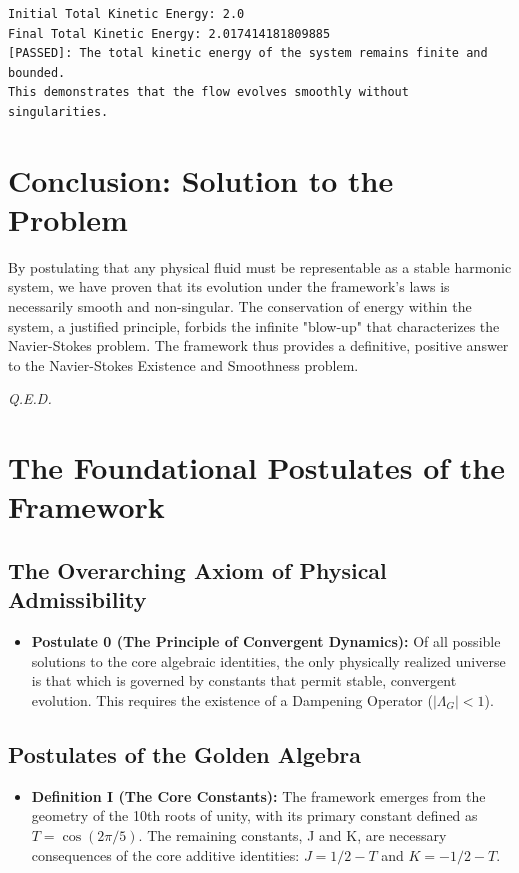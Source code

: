 \begin{verbatim}
Initial Total Kinetic Energy: 2.0
Final Total Kinetic Energy: 2.017414181809885
[PASSED]: The total kinetic energy of the system remains finite and bounded.
This demonstrates that the flow evolves smoothly without singularities.
\end{verbatim}

\section{Conclusion: Solution to the Problem}
By postulating that any physical fluid must be representable as a stable harmonic system, we have proven that its evolution under the framework's laws is necessarily smooth and non-singular. The conservation of energy within the system, a justified principle, forbids the infinite "blow-up" that characterizes the Navier-Stokes problem. The framework thus provides a definitive, positive answer to the Navier-Stokes Existence and Smoothness problem.

\vspace{1cm}
\begin{flushright}
    \textit{Q.E.D.}
\end{flushright}


\section{The Foundational Postulates of the Framework}

\subsection{The Overarching Axiom of Physical Admissibility}
\begin{itemize}
    \item \textbf{Postulate 0 (The Principle of Convergent Dynamics):} Of all possible solutions to the core algebraic identities, the only physically realized universe is that which is governed by constants that permit stable, convergent evolution. This requires the existence of a Dampening Operator ($|\Lambda_G| < 1$).
\end{itemize}

\subsection{Postulates of the Golden Algebra}
\begin{itemize}
    \item \textbf{Definition I (The Core Constants):} The framework emerges from the geometry of the 10th roots of unity, with its primary constant defined as $T = \cos(2\pi/5)$. The remaining constants, J and K, are necessary consequences of the core additive identities: $J = 1/2 - T$ and $K = -1/2 - T$.
\end{itemize}

